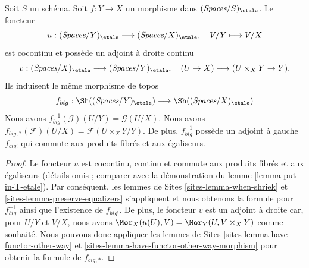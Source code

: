 \begin{lemma}
\label{lemma-morphism-big-etale}
Soit $S$ un schéma. Soit $f : Y \to X$ un morphisme dans
$(\textit{Spaces}/S)_\etale$. Le foncteur
$$
u :
(\textit{Spaces}/Y)_\etale
\longrightarrow
(\textit{Spaces}/X)_\etale,
\quad
V/Y \longmapsto V/X
$$
est cocontinu et possède un adjoint à droite continu
$$
v :
(\textit{Spaces}/X)_\etale
\longrightarrow
(\textit{Spaces}/Y)_\etale,
\quad
(U \to X) \longmapsto (U \times_X Y \to Y).
$$
Ils induisent le même morphisme de topos
$$
f_{big} :
\Sh((\textit{Spaces}/Y)_\etale)
\longrightarrow
\Sh((\textit{Spaces}/X)_\etale)
$$
Nous avons $f_{big}^{-1}(\mathcal{G})(U/Y) = \mathcal{G}(U/X)$.
Nous avons $f_{big, *}(\mathcal{F})(U/X) = \mathcal{F}(U \times_X Y/Y)$.
De plus, $f_{big}^{-1}$ possède un adjoint à gauche $f_{big!}$ qui commute aux
produits fibrés et aux égaliseurs.
\end{lemma}

\begin{proof}
Le foncteur $u$ est cocontinu, continu et commute aux produits fibrés
et aux égaliseurs (détails omis ; comparer avec la démonstration du
lemme \ref{lemma-put-in-T-etale}).
Par conséquent,
les lemmes de Sites \ref{sites-lemma-when-shriek} et
\ref{sites-lemma-preserve-equalizers}
s'appliquent et nous obtenons la formule
pour $f_{big}^{-1}$ ainsi que l'existence de $f_{big!}$. De plus,
le foncteur $v$ est un adjoint à droite car, pour $U/Y$ et $V/X$,
nous avons $\Mor_X(u(U), V) = \Mor_Y(U, V \times_X Y)$
comme souhaité. Nous pouvons donc appliquer
les lemmes de Sites \ref{sites-lemma-have-functor-other-way} et
\ref{sites-lemma-have-functor-other-way-morphism} pour obtenir la
formule de $f_{big, *}$.
\end{proof}

